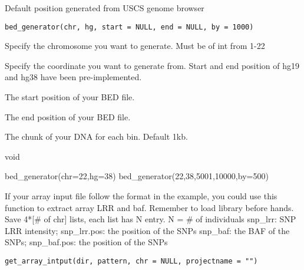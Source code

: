 \documentclass[a4paper]{book}
\begin{document}
%
\begin{Description}\relax
Default position generated from USCS genome browser
\end{Description}
%
\begin{Usage}
\begin{verbatim}
bed_generator(chr, hg, start = NULL, end = NULL, by = 1000)
\end{verbatim}
\end{Usage}
%
\begin{Arguments}
\begin{ldescription}
\item[\code{chr}] Specify the chromosome you want to generate. Must be of int from 1-22

\item[\code{hg}] Specify the coordinate you want to generate from. Start and end position of hg19 and hg38 have been pre-implemented.

\item[\code{start}] The start position of your BED file.

\item[\code{end}] The end position of your BED file.

\item[\code{by}] The chunk of your DNA for each bin. Default 1kb.
\end{ldescription}
\end{Arguments}
%
\begin{Value}
void
\end{Value}
%
\begin{Examples}
\begin{ExampleCode}
bed_generator(chr=22,hg=38)
bed_generator(22,38,5001,10000,by=500)
\end{ExampleCode}
\end{Examples}
%
\begin{Description}\relax
If your array input file follow the format in the example, you could use this function to extract array LRR and baf. Remember to load library before hands.
Save 4*[\# of chr] lists, each list has N entry. N = \# of individuals
snp\_lrr: SNP LRR intensity; snp\_lrr.pos: the position of the SNPs
snp\_baf: the BAF of the SNPs; snp\_baf.pos: the position of the SNPs
\end{Description}
%
\begin{Usage}
\begin{verbatim}
get_array_intput(dir, pattern, chr = NULL, projectname = "")
\end{verbatim}
\end{Usage}
\end{document}
